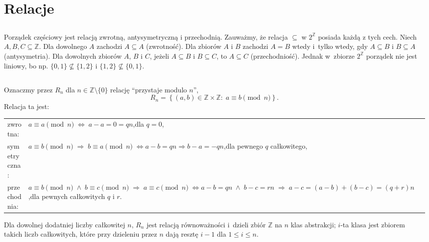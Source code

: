 \section{Relacje}

\subsection{} %
Porządek częściowy jest relacją zwrotną, antysymetryczną i przechodnią. Zauważmy, że relacja $\subseteq$ w $2^\mathbb{Z}$ posiada każdą z tych cech. Niech $A,B,C\subseteq\mathbb{Z}$. Dla dowolnego $A$ zachodzi $A\subseteq A$ (zwrotność). Dla zbiorów $A$ i $B$ zachodzi $A=B$ wtedy i~tylko wtedy, gdy $A\subseteq B$ i $B\subseteq A$ (antysymetria). Dla dowolnych zbiorów $A$, $B$ i $C$, jeżeli $A\subseteq B$ i $B\subseteq C$, to $A\subseteq C$ (przechodniość). Jednak w~zbiorze $2^\mathbb{Z}$ porządek nie jest liniowy, bo np. $\{0,1\}\not\subseteq\{1,2\}$ i $\{1,2\}\not\subseteq\{0,1\}$.

\subsection{} %
Oznaczmy przez $R_n$ dla $n\in\mathbb{Z}\setminus\{ 0\}$ relację ``przystaje modulo $n$'',
\[
	R_n = \left\{(a,b)\in\mathbb{Z}\times\mathbb{Z}:\;a\equiv b\pmod{n}\right\}.
\]
Relacja ta jest:\medskip\\
\begin{tabular}{ll}
	zwrotna: & \parbox[t]{3.6in}{$a\equiv a\pmod{n}\;\Leftrightarrow\;a-a=0=qn$,\quad dla $q=0$,} \medskip\\
	symetryczna: & \parbox[t]{3.6in}{$a\equiv b\pmod{n}\;\Rightarrow\;b\equiv a\pmod{n}\;\Leftrightarrow\\a-b=qn\Rightarrow b-a=-qn$,\quad dla pewnego $q$ całkowitego,} \medskip\\
	przechodnia: & \parbox[t]{3.6in}{$a\equiv b\pmod{n}\;\wedge\;b\equiv c\pmod{n}\;\Rightarrow\;a\equiv c\pmod{n}\;\Leftrightarrow\\a-b=qn\;\wedge\;b-c=rn\;\Rightarrow\;a-c=(a-b)+(b-c)=(q+r)n$,\quad dla pewnych całkowitych $q$ i $r$.} \medskip\\
\end{tabular}

Dla dowolnej dodatniej liczby całkowitej $n$, $R_n$ jest relacją równoważności i~dzieli zbiór $\mathbb{Z}$ na $n$ klas abstrakcji; $i$-ta klasa jest zbiorem takich liczb całkowitych, które przy dzieleniu przez $n$ dają resztę $i-1$ dla $1\le i\le n$.

